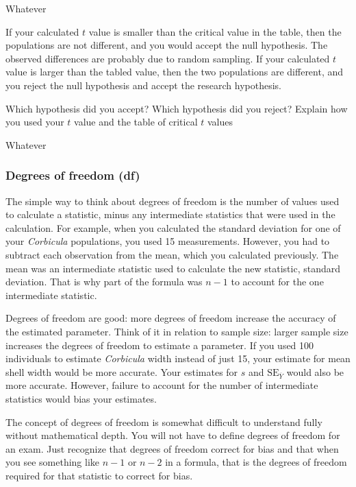 \documentclass[12pt]{exam}
\newcommand*\AnswerBox[2]{%
    \parbox[t][#1]{0.92\textwidth}{%
    \begin{solution}#2\end{solution}}
}
\newcommand*\meansubY{\overline{Y}}
\newcommand*\Corbicula{\textit{Corbicula}}
\begin{document}
\begin{questions}
\AnswerBox{2\baselineskip}{Whatever}

If your calculated $t$ value is smaller than the critical value in the table, then the populations are not different, and you would accept the null hypothesis. The observed differences are probably due to random sampling. If your calculated $t$ value is larger than the tabled value, then the two populations are different, and you reject the null hypothesis and accept the research hypothesis.

\newpage

\question
Which hypothesis did you accept? Which hypothesis did you reject? Explain how you used your $t$ value and the table of critical $t$ values 

\AnswerBox{6\baselineskip}{Whatever}




\end{questions}



\subsubsection*{Degrees of freedom (df)}\label{degrees_freedom}

The simple way to think about degrees of freedom is the number of values used to calculate a statistic, minus any intermediate statistics that were used in the calculation. For example, when you calculated the standard deviation for one of your \Corbicula{} populations, you used 15 measurements. However, you had to subtract each observation from the mean, which you calculated previously. The mean was an intermediate statistic used to calculate the new statistic, standard deviation. That is why part of the formula was $n-1$ to account for the one intermediate statistic. 

Degrees of freedom are good: more degrees of freedom increase the accuracy of the estimated parameter. Think of it in relation to sample size: larger sample size increases the degrees of freedom to estimate a parameter. If you used 100 individuals to estimate \Corbicula{} width instead of just 15, your estimate for mean shell width would be more accurate. Your estimates for $s$ and $\mathrm{SE}_{\meansubY}$ would also be more accurate. However, failure to account for the number of intermediate statistics would bias your estimates.

The concept of degrees of freedom is somewhat difficult to understand fully without mathematical depth. You will not have to define degrees of freedom for an exam. Just recognize that degrees of freedom correct for bias and that when you see something like $n-1$ or $n-2$ in a formula, that is the degrees of freedom required for that statistic to correct for bias.
\end{document}
